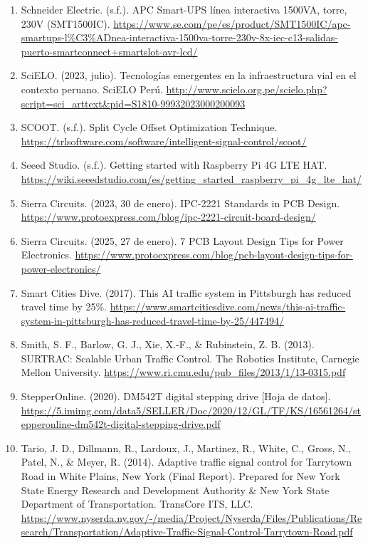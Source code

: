\begin{enumerate}
\item
  Schneider Electric. (s.f.). APC Smart-UPS línea interactiva 1500VA, torre, 230V (SMT1500IC). \url{https://www.se.com/pe/es/product/SMT1500IC/apc-smartups-l%C3%ADnea-interactiva-1500va-torre-230v-8x-iec-c13-salidas-puerto-smartconnect+smartslot-avr-lcd/}
\item
  SciELO. (2023, julio). Tecnologías emergentes en la infraestructura vial en el contexto peruano. SciELO Perú. \url{http://www.scielo.org.pe/scielo.php?script=sci_arttext&pid=S1810-99932023000200093}
\item
  SCOOT. (s.f.). Split Cycle Offset Optimization Technique. \url{https://trlsoftware.com/software/intelligent-signal-control/scoot/}
\item
  Seeed Studio. (s.f.). Getting started with Raspberry Pi 4G LTE HAT. \url{https://wiki.seeedstudio.com/es/getting_started_raspberry_pi_4g_lte_hat/}
\item
  Sierra Circuits. (2023, 30 de enero). IPC-2221 Standards in PCB Design. \url{https://www.protoexpress.com/blog/ipc-2221-circuit-board-design/}
\item
  Sierra Circuits. (2025, 27 de enero). 7 PCB Layout Design Tips for Power Electronics. \url{https://www.protoexpress.com/blog/pcb-layout-design-tips-for-power-electronics/}
\item
  Smart Cities Dive. (2017). This AI traffic system in Pittsburgh has reduced travel time by 25\%. \url{https://www.smartcitiesdive.com/news/this-ai-traffic-system-in-pittsburgh-has-reduced-travel-time-by-25/447494/}
\item
  Smith, S. F., Barlow, G. J., Xie, X.-F., \& Rubinstein, Z. B. (2013). SURTRAC: Scalable Urban Traffic Control. The Robotics Institute, Carnegie Mellon University. \url{https://www.ri.cmu.edu/pub_files/2013/1/13-0315.pdf}
\item
  StepperOnline. (2020). DM542T digital stepping drive {[}Hoja de datos{]}. \url{https://5.imimg.com/data5/SELLER/Doc/2020/12/GL/TF/KS/16561264/stepperonline-dm542t-digital-stepping-drive.pdf}
\item
  Tario, J. D., Dillmann, R., Lardoux, J., Martinez, R., White, C., Gross, N., Patel, N., \& Meyer, R. (2014). Adaptive traffic signal control for Tarrytown Road in White Plains, New York (Final Report). Prepared for New York State Energy Research and Development Authority \& New York State Department of Transportation. TransCore ITS, LLC. \url{https://www.nyserda.ny.gov/-/media/Project/Nyserda/Files/Publications/Research/Transportation/Adaptive-Traffic-Signal-Control-Tarrytown-Road.pdf}

\end{enumerate}
